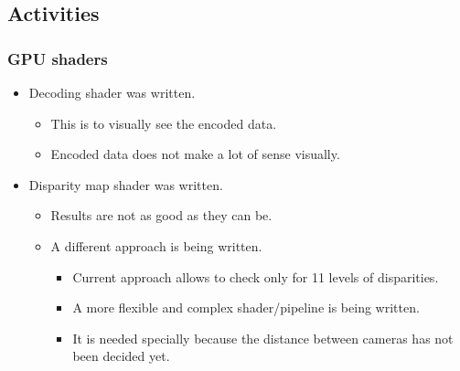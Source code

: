 \subsection{Activities}


\subsubsection{GPU shaders}
\begin{itemize}
	\item Decoding shader was written.
	\begin{itemize}
		\item This is to visually see the encoded data.
		\item Encoded data does not make a lot of sense visually.
	\end{itemize}
	\item Disparity map shader was written.
	\begin{itemize}
		\item Results are not as good as they can be.
		\item A different approach is being written.
		\begin{itemize}
			\item Current approach allows to check only for 11 levels of disparities.
			\item A more flexible and complex shader/pipeline is being written.
			\item It is needed specially because the distance between cameras has not been decided yet.
		\end{itemize}
	\end{itemize}
\end{itemize}


